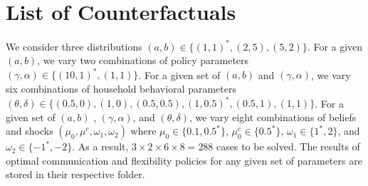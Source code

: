 \documentclass[12pt,a4paper]{article}
\begin{document}
\section{List of Counterfactuals}

We consider three distributions $(a,b) \in \{(1,1)^*, (2,5), (5,2)\}$. For a given $(a,b)$, we vary two combinations of policy parameters $(\gamma,\alpha) \in \{(10,1)^*, (1,1)\}$. For a given set of $(a,b)$ and $(\gamma, \alpha)$, we vary six combinations of household behavioral parameters $(\theta,\delta) \in \{(0.5, 0), (1, 0), (0.5, 0.5), (1, 0.5)^*, (0.5, 1), (1, 1)\}$. For a given set of $(a,b)$ , $(\gamma,\alpha)$, and $(\theta,\delta)$, we vary eight combinations of beliefs and shocks $(\mu_0, \mu^c, \omega_1, \omega_2)$ where $\mu_0 \in \{0.1, 0.5^*\}$, $\mu_0^c \in \{0.5^*\}$, $\omega_1 \in \{1^*, 2\}$, and $\omega_2 \in \{-1^*, -2\}$. As a result, $3 \times 2 \times 6 \times 8 = 288$ cases to be solved. The results of optimal communication and flexibility policies for any given set of parameters are stored in their respective folder.
\end{document}
